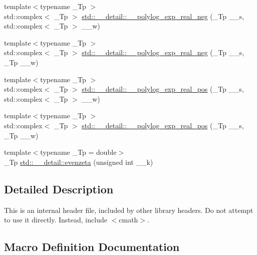 \begin{DoxyCompactItemize}
\item 
{\footnotesize template$<$typename \+\_\+\+Tp $>$ }\\std\+::complex$<$ \+\_\+\+Tp $>$ \hyperlink{namespacestd_1_1____detail_abe2e38af779623f338c77dc46ac673bd}{std\+::\+\_\+\+\_\+detail\+::\+\_\+\+\_\+polylog\+\_\+exp\+\_\+real\+\_\+neg} (\+\_\+\+Tp \+\_\+\+\_\+s, std\+::complex$<$ \+\_\+\+Tp $>$ \+\_\+\+\_\+w)
\item 
{\footnotesize template$<$typename \+\_\+\+Tp $>$ }\\std\+::complex$<$ \+\_\+\+Tp $>$ \hyperlink{namespacestd_1_1____detail_ac9ae4e4771187bac37c1ccc83719feb2}{std\+::\+\_\+\+\_\+detail\+::\+\_\+\+\_\+polylog\+\_\+exp\+\_\+real\+\_\+neg} (\+\_\+\+Tp \+\_\+\+\_\+s, \+\_\+\+Tp \+\_\+\+\_\+w)
\item 
{\footnotesize template$<$typename \+\_\+\+Tp $>$ }\\std\+::complex$<$ \+\_\+\+Tp $>$ \hyperlink{namespacestd_1_1____detail_ab27023a3d94393d41c994000b2c16684}{std\+::\+\_\+\+\_\+detail\+::\+\_\+\+\_\+polylog\+\_\+exp\+\_\+real\+\_\+pos} (\+\_\+\+Tp \+\_\+\+\_\+s, std\+::complex$<$ \+\_\+\+Tp $>$ \+\_\+\+\_\+w)
\item 
{\footnotesize template$<$typename \+\_\+\+Tp $>$ }\\std\+::complex$<$ \+\_\+\+Tp $>$ \hyperlink{namespacestd_1_1____detail_ad77bb9953443dfb1575a61a4573c6913}{std\+::\+\_\+\+\_\+detail\+::\+\_\+\+\_\+polylog\+\_\+exp\+\_\+real\+\_\+pos} (\+\_\+\+Tp \+\_\+\+\_\+s, \+\_\+\+Tp \+\_\+\+\_\+w)
\item 
{\footnotesize template$<$typename \+\_\+\+Tp  = double$>$ }\\\+\_\+\+Tp \hyperlink{namespacestd_1_1____detail_af59bd2be508cc6a421ddf5dd70c93d97}{std\+::\+\_\+\+\_\+detail\+::evenzeta} (unsigned int \+\_\+\+\_\+k)
\end{DoxyCompactItemize}


\subsection{Detailed Description}
This is an internal header file, included by other library headers. Do not attempt to use it directly. Instead, include $<$cmath$>$. 

\subsection{Macro Definition Documentation}
\hypertarget{sf__polylog_8tcc_ab6c10ff949c404f48f72645a3fe8a674}{}
